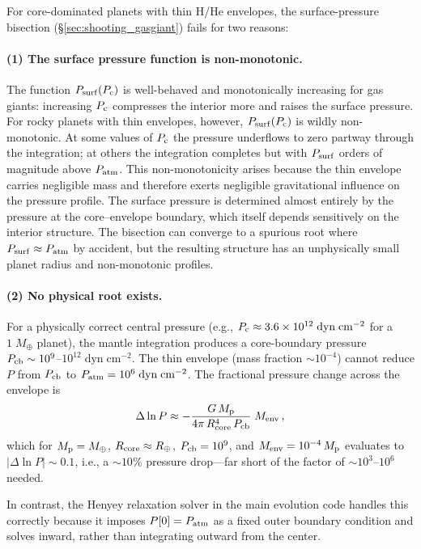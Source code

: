 \documentclass{aastex631}
\newcommand{\Mpl}{M_{\rm p}}
\newcommand{\Menv}{M_{\rm env}}
\newcommand{\Rcore}{R_{\rm core}}
\newcommand{\Pc}{P_{\rm c}}
\newcommand{\Patm}{P_{\rm atm}}
\newcommand{\Psurf}{P_{\rm surf}}
\newcommand{\Pcb}{P_{\rm cb}}
\begin{document}
For core-dominated planets with thin H/He envelopes, the surface-pressure
bisection (\S\ref{sec:shooting_gasgiant}) fails for two reasons:

\paragraph{(1) The surface pressure function is non-monotonic.}
The function $\Psurf(\Pc)$ is well-behaved and monotonically increasing
for gas giants: increasing $\Pc$ compresses the interior more and raises
the surface pressure.  For rocky planets with thin envelopes, however,
$\Psurf(\Pc)$ is wildly non-monotonic.  At some values of $\Pc$ the
pressure underflows to zero partway through the integration; at others
the integration completes but with $\Psurf$ orders of magnitude above
$\Patm$.  This non-monotonicity arises because the thin envelope carries
negligible mass and therefore exerts negligible gravitational influence
on the pressure profile.  The surface pressure is determined almost
entirely by the pressure at the core--envelope boundary, which itself
depends sensitively on the interior structure.  The bisection can
converge to a spurious root where $\Psurf \approx \Patm$ by accident,
but the resulting structure has an unphysically small planet radius and
non-monotonic profiles.

\paragraph{(2) No physical root exists.}
For a physically correct central pressure (e.g., $\Pc \approx 3.6
\times 10^{12}\;\mathrm{dyn\;cm^{-2}}$ for a $1\;M_\oplus$ planet), the
mantle integration produces a core-boundary pressure $\Pcb \sim
10^{9}$--$10^{12}\;\mathrm{dyn\;cm^{-2}}$.  The thin envelope (mass
fraction $\sim 10^{-4}$) cannot reduce $P$ from $\Pcb$ to
$\Patm = 10^{6}\;\mathrm{dyn\;cm^{-2}}$.  The fractional pressure change
across the envelope is
\begin{equation}\label{eq:DeltalnP}
  \Delta\ln P \approx
    -\frac{G\,\Mpl}{4\pi\,\Rcore^{4}\,\Pcb}\;\Menv\,,
\end{equation}
which for $\Mpl = M_\oplus$, $\Rcore \approx R_\oplus$, $\Pcb = 10^{9}$,
and $\Menv = 10^{-4}\,\Mpl$ evaluates to $|\Delta\ln P| \sim 0.1$,
i.e., a $\sim 10\%$ pressure drop---far short of the factor of
$\sim 10^{3}$--$10^{6}$ needed.

In contrast, the Henyey relaxation solver in the main evolution code
handles this correctly because it imposes $P[0] = \Patm$ as a fixed
outer boundary condition and solves inward, rather than integrating
outward from the center.
\end{document}
